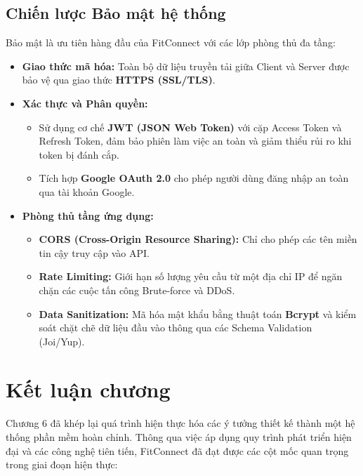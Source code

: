 \subsection{Chiến lược Bảo mật hệ thống}
\label{subsec:impl_security}

Bảo mật là ưu tiên hàng đầu của FitConnect với các lớp phòng thủ đa tầng:
\begin{itemize}
    \item \textbf{Giao thức mã hóa:} Toàn bộ dữ liệu truyền tải giữa Client và Server được bảo vệ qua giao thức \textbf{HTTPS (SSL/TLS)}.
    \item \textbf{Xác thực và Phân quyền:} 
    \begin{itemize}
        \item Sử dụng cơ chế \textbf{JWT (JSON Web Token)} với cặp Access Token và Refresh Token, đảm bảo phiên làm việc an toàn và giảm thiểu rủi ro khi token bị đánh cắp.
        \item Tích hợp \textbf{Google OAuth 2.0} cho phép người dùng đăng nhập an toàn qua tài khoản Google.
    \end{itemize}
    \item \textbf{Phòng thủ tầng ứng dụng:}
    \begin{itemize}
        \item \textbf{CORS (Cross-Origin Resource Sharing):} Chỉ cho phép các tên miền tin cậy truy cập vào API.
        \item \textbf{Rate Limiting:} Giới hạn số lượng yêu cầu từ một địa chỉ IP để ngăn chặn các cuộc tấn công Brute-force và DDoS.
        \item \textbf{Data Sanitization:} Mã hóa mật khẩu bằng thuật toán \textbf{Bcrypt} và kiểm soát chặt chẽ dữ liệu đầu vào thông qua các Schema Validation (Joi/Yup).
    \end{itemize}
\end{itemize}

\section{Kết luận chương}
\label{sec:impl_conclusion}

Chương 6 đã khép lại quá trình hiện thực hóa các ý tưởng thiết kế thành một hệ thống phần mềm hoàn chỉnh. Thông qua việc áp dụng quy trình phát triển hiện đại và các công nghệ tiên tiến, FitConnect đã đạt được các cột mốc quan trọng trong giai đoạn hiện thực:

